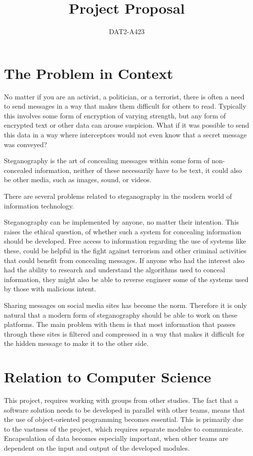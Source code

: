 \documentclass[a4paper,12pt,hidelinks]{article}
\newcommand{\group}{DAT2-A423}
\begin{document}
	\title{Project Proposal}
	\author{\group}
	\maketitle	
	\section*{The Problem in Context}
No matter if you are an activist, a politician, or a terrorist, there is often a need to send messages in a way that makes them difficult for others to read. Typically this involves some form of encryption of varying strength, but any form of encrypted text or other data can arouse suspicion. What if it was possible to send this data in a way where interceptors would not even know that a secret message was conveyed? 

Steganography is the art of concealing messages within some form of non-concealed information, neither of these necessarily have to be text, it could also be other media, such as images, sound, or videos.

There are several problems related to steganography in the modern world of information technology. 

Steganography can be implemented by anyone, no matter their intention. This raises the ethical question, of whether such a system for concealing information should be developed. Free access to information regarding the use of systems like these, could be helpful in the fight against terrorism and other criminal activities that could benefit from concealing messages. If anyone who had the interest also had the ability to research and understand the algorithms used to conceal information, they might also be able to reverse engineer some of the systems used by those with malicious intent.

Sharing messages on social media sites has become the norm. Therefore it is only natural that a modern form of steganography should be able to work on these platforms. The main problem with them is that most information that passes through these sites is filtered and compressed in a way that makes it difficult for the hidden message to make it to the other side.

	\section*{Relation to Computer Science}
This project, requires working with groups from other studies. The fact that a software solution needs to be developed in parallel with other teams, means that the use of object-oriented programming becomes essential. This is primarily due to the vastness of the project, which requires separate modules to communicate. Encapsulation of data becomes especially important, when other teams are dependent on the input and output of the developed modules.
	
\end{document}
